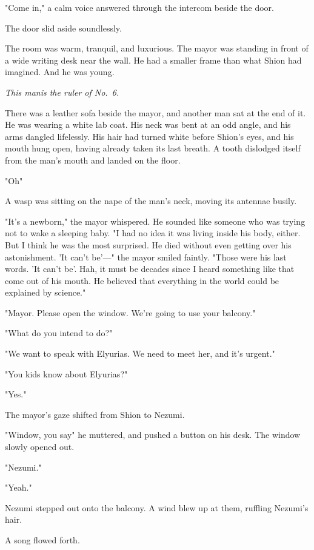 "Come in," a calm voice answered through the intercom beside the door.

The door slid aside soundlessly.

The room was warm, tranquil, and luxurious. The mayor was standing in
front of a wide writing desk near the wall. He had a smaller frame than
what Shion had imagined. And he was young.

\emph{This man\el is the ruler of No.~6.}

There was a leather sofa beside the mayor, and another man sat at the
end of it. He was wearing a white lab coat. His neck was bent at an odd
angle, and his arms dangled lifelessly. His hair had turned white before
Shion's eyes, and his mouth hung open, having already taken its last
breath. A tooth dislodged itself from the man's mouth and landed on the
floor.

"Oh\el "

A wasp was sitting on the nape of the man's neck, moving its antennae
busily.

"It's a newborn," the mayor whispered. He sounded like someone who was
trying not to wake a sleeping baby. "I had no idea it was living inside
his body, either. But I think he was the most surprised. He died without
even getting over his astonishment. 'It can't be'---" the mayor smiled
faintly. "Those were his last words. 'It can't be'. Hah, it must be
decades since I heard something like that come out of his mouth. He
believed that everything in the world could be explained by science."

"Mayor. Please open the window. We're going to use your balcony."

"What do you intend to do?"

"We want to speak with Elyurias. We need to meet her, and it's urgent."

"You kids know about Elyurias?"

"Yes."

The mayor's gaze shifted from Shion to Nezumi.

"Window, you say\el " he muttered, and pushed a button on his desk. The
window slowly opened out.

"Nezumi."

"Yeah."

Nezumi stepped out onto the balcony. A wind blew up at them, ruffling
Nezumi's hair.

A song flowed forth.


